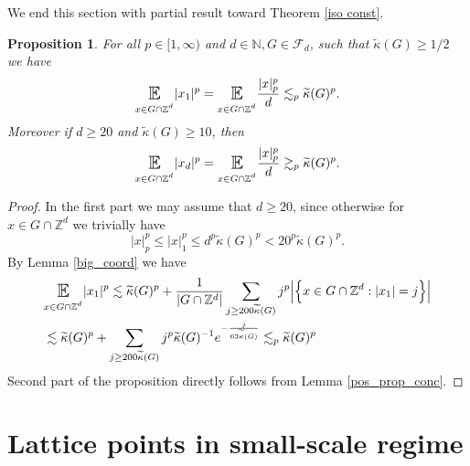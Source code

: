 \documentclass[10pt,a4paper]{amsart}
\numberwithin{equation}{section}
\newtheorem{Prop}[Thm]{Proposition}
\newcommand{\E}{\mathop{\mathbb{E}}}
\newcommand{\Z}{\mathbb{Z}}
\newcommand{\N}{\mathbb{N}}
\newcommand{\se}[1]{\underset{_{\substack{#1}}}{\mathlarger{\mathlarger{\E}}}}
\begin{document}
We end this section with partial result toward Theorem \ref{iso const}.
\begin{Prop} \label{concen medium}
     For all $p \in [1,\infty)$ and $d \in \N, G \in \mathcal{F}_d$, such that $\widetilde{\kappa}(G) \ge 1/2$ we have
    \[
    \se{x \in G \cap \Z^d} |x_1|^p= \se{x \in G \cap \Z^d} \frac{|x|_p^p}{d} \lesssim_{p} \widetilde{\kappa}(G)^p.
    \]
    Moreover if $d \ge 20$ and $\widetilde{\kappa}(G) \ge 10$, then
    \[
   \se{x \in G \cap \Z^d} |x_d|^p= \se{x \in G \cap \Z^d} \frac{|x|_p^p}{d} \gtrsim_{p} \widetilde{\kappa}(G)^p.
    \]
\end{Prop}
\begin{proof}
    In the first part we may assume that $d \ge 20$, since otherwise for $x \in G \cap \Z^d$ we trivially have
    \[
    |x|_p^p \le |x|_1^p \le d^p \widetilde{\kappa}(G)^p <20^p\widetilde{\kappa}(G)^p.
    \]
    By Lemma \ref{big_coord} we have 
    \begin{align*}
        &\se{x \in G \cap \Z^d} |x_1|^p \lesssim \widetilde{\kappa}(G)^p+  \frac{1}{|G \cap \Z^d|}\sum_{j \ge 200 \widetilde{\kappa}(G)} j^p \Big|\Big\{ x \in G \cap \Z^d: |x_1|=j \Big\}\Big| \\
        &\lesssim\widetilde{\kappa}(G)^p+\sum_{j \ge 200 \widetilde{\kappa}(G)} j^p \widetilde{\kappa}(G)^{-1} e^{-\frac{j}{63 \widetilde{\kappa}(G)}} \lesssim_p \widetilde{\kappa}(G)^p
    \end{align*}
    Second part of the proposition directly follows from Lemma \ref{pos_prop_conc}.
\end{proof}




\section{Lattice points in small-scale regime}
\end{document}
